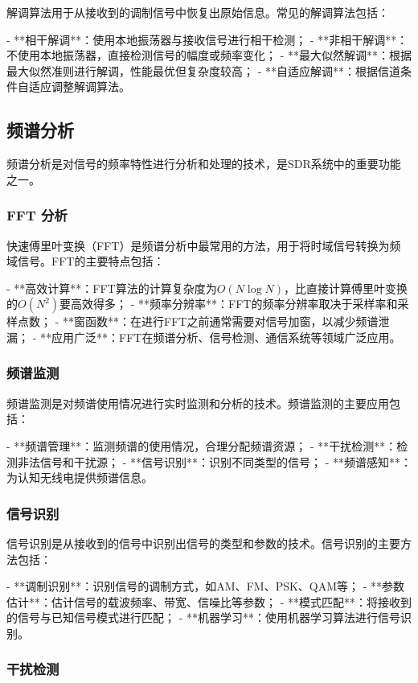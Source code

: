 ﻿\documentclass[UTF8]{ctexbook}
\begin{document}
解调算法用于从接收到的调制信号中恢复出原始信息。常见的解调算法包括：

- **相干解调**：使用本地振荡器与接收信号进行相干检测；
- **非相干解调**：不使用本地振荡器，直接检测信号的幅度或频率变化；
- **最大似然解调**：根据最大似然准则进行解调，性能最优但复杂度较高；
- **自适应解调**：根据信道条件自适应调整解调算法。
\subsection{频谱分析}

频谱分析是对信号的频率特性进行分析和处理的技术，是SDR系统中的重要功能之一。

\subsubsection{FFT 分析}

快速傅里叶变换（FFT）是频谱分析中最常用的方法，用于将时域信号转换为频域信号。FFT的主要特点包括：

- **高效计算**：FFT算法的计算复杂度为$O(N \log N)$，比直接计算傅里叶变换的$O(N^2)$要高效得多；
- **频率分辨率**：FFT的频率分辨率取决于采样率和采样点数；
- **窗函数**：在进行FFT之前通常需要对信号加窗，以减少频谱泄漏；
- **应用广泛**：FFT在频谱分析、信号检测、通信系统等领域广泛应用。

\subsubsection{频谱监测}

频谱监测是对频谱使用情况进行实时监测和分析的技术。频谱监测的主要应用包括：

- **频谱管理**：监测频谱的使用情况，合理分配频谱资源；
- **干扰检测**：检测非法信号和干扰源；
- **信号识别**：识别不同类型的信号；
- **频谱感知**：为认知无线电提供频谱信息。

\subsubsection{信号识别}

信号识别是从接收到的信号中识别出信号的类型和参数的技术。信号识别的主要方法包括：

- **调制识别**：识别信号的调制方式，如AM、FM、PSK、QAM等；
- **参数估计**：估计信号的载波频率、带宽、信噪比等参数；
- **模式匹配**：将接收到的信号与已知信号模式进行匹配；
- **机器学习**：使用机器学习算法进行信号识别。

\subsubsection{干扰检测}
\end{document}
